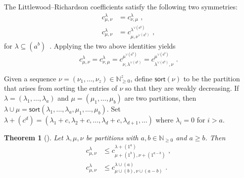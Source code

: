 \documentclass[10pt]{article}
\newtheorem{theorem}{Theorem}[section]
\theoremstyle{definition}
\newcommand{\sort}{\mathsf{sort}}
\begin{document}
The Littlewood--Richardson coefficients satisfy the following two symmetries:
\begin{align}
\label{eq:LRsymmetrybasic}
c_{\mu, \nu}^{\lambda} &= c_{\nu, \mu}^{\lambda}\,\, ,
\\ 
\label{eq:LRsymmetry-transpose}
c_{\mu, \nu}^{\lambda} &= c_{\mu, \nu^{\vee(a^b)}}^{\lambda^{\vee(a^b)}}\,\, ,
\end{align}
for $\lambda \subseteq (a^b)$~\cite{S99}. Applying the two above identities yields
\begin{equation}
\label{eq:LRsymmetry-rotate}
c^\lambda_{\mu,\nu} = c^\lambda_{\nu,\mu} = c^{\mu^{\vee(a^b)}}_{\nu, \lambda^{\vee(a^b)}} = c^{\mu^{\vee(a^b)}}_{\lambda^{\vee(a^b)}, \nu}\, \,.
\end{equation}

Given a sequence $\nu = (\nu_1,\ldots,\nu_z)\in \mathbb{N}_{\geq 0}^z$, define $\sort(\nu)$ to be the partition that arises from sorting the entries of $\nu$ so that they are weakly decreasing. If $\lambda = (\lambda_1,\ldots,\lambda_a)$ and $\mu = (\mu_1,\ldots,\mu_b)$ are two partitions, then $\lambda \cup \mu = \sort (\lambda_1,\ldots,\lambda_a,\mu_1,\ldots,\mu_b)$. Set $\lambda + (c^d) = (\lambda_1 + c, \lambda_2 + c,\ldots,\lambda_d + c, \lambda_{d+1}, \ldots)$ where $\lambda_i = 0$ for $i > a$.

\begin{theorem}[{\cite[Theorem 3.1]{G10}}] \label{theorem:gutReduction} Let $\lambda, \mu, \nu$ be partitions with $a,b \in \mathbb{N}_{\geq 0}$ and $a \geq b$. Then 
\begin{align}
\label{eq:LRsymmetryswap}
c_{\mu,\nu}^{\lambda} &\leq c_{\mu + (1^b),\nu + (1^{a-b})}^{\lambda + (1^a)}\, \, ,
\\
c_{\mu,\nu}^{\lambda} &\leq c_{\mu \cup (b),\nu \cup (a-b)}^{\lambda \cup (a)}\, \,.
\end{align}

\end{theorem}
\end{document}
